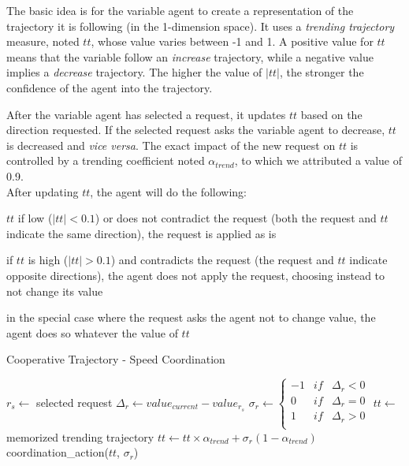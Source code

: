 The basic idea is for the variable agent to create a representation of the trajectory it is following (in the 1-dimension space). It uses a \emph{trending trajectory} measure, noted $tt$, whose value varies between -1 and 1. A positive value for $tt$ means that the variable follow an \emph{increase} trajectory, while a negative value implies a \emph{decrease} trajectory. The higher the value of $|tt|$, the stronger the confidence of the agent into the trajectory.

After the variable agent has selected a request, it updates $tt$ based on the direction requested. If the selected request asks the variable agent to decrease, $tt$ is decreased and \emph{vice versa}. The exact impact of the new request on $tt$ is controlled by a trending coefficient noted $\alpha_{trend}$, to which we attributed a value of 0.9.\\
After updating $tt$, the agent will do the following:
\begin{compactitem}
\item $tt$ if low ($|tt|< 0.1$) or does not contradict the request (both the request and $tt$ indicate the same direction), the request is applied as is
\item if $tt$ is high ($|tt|> 0.1$) and contradicts the request (the request and $tt$ indicate opposite directions), the agent does not apply the request, choosing instead to not change its value
\item in the special case where the request asks the agent not to change value, the agent does so whatever the value of $tt$
\end{compactitem}

\begin{algorithm}
\caption{Cooperative Trajectory - Speed Coordination}
\label{algo_speed_coordination}
	$r_s \leftarrow$ selected request\;
	\BlankLine
	$\Delta_r \leftarrow value_{current} - value_{r_{s}}$\;
	$\sigma_r \leftarrow \left\{
 									\begin{array}{rcr}
 									-1 & if &\Delta_r < 0 \\
 									0 & if &\Delta_r = 0\\ 
 									1 & if &\Delta_r > 0 \\
								\end{array}
								\right.$\;
	\BlankLine
	$tt \leftarrow$ memorized trending trajectory\;
	$tt \leftarrow tt \times \alpha_{trend}	+ \sigma_r(1 - \alpha_{trend})$\;
	\BlankLine
	coordination\_action($tt$, $\sigma_r$)	\;
\end{algorithm}

